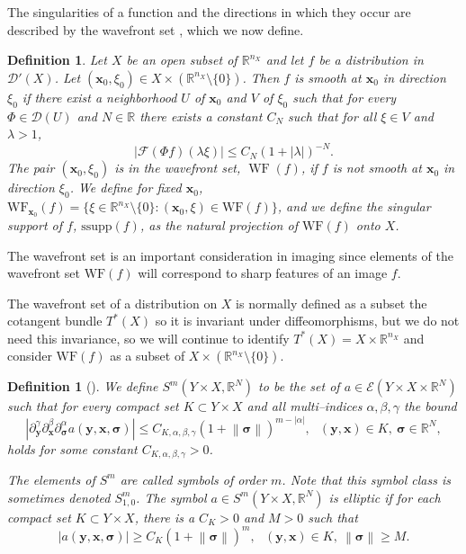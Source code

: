 \documentclass[11pt]{article}
\newcommand{\wf}{\operatorname{WF}}
\newcommand{\be}{\begin{equation}}
\newcommand{\ee}{\end{equation}}
\newcommand{\WF}{\mathrm{WF}}
\newcommand{\br}{\mathbb{R}}
\newcommand{\bt}{\beta}
\newcommand{\al}{\alpha}
\numberwithin{equation}{section}
\newcommand{\bel}[1]{\be\label{#1}}
\newcommand{\norm}[1]{\left\lVert#1\right\rVert}      %
\newcommand{\abs}[1]{\left|#1\right|}                 %
\newcommand{\vy}{\mathbf{y}}
\newcommand{\vx}{\mathbf{x}}
\newcommand{\Dc}{\mathcal{D}}
\newcommand{\Ec}{\mathcal{E}}
\newcommand{\Fc}{\mathcal{F}}
\newcommand{\vsig}{{\boldsymbol{\sigma}}}
\newcommand{\rr}{{{\mathbb R}}}
\newcommand{\rn}{{{\mathbb R}^n}}
\newtheorem{definition}[theorem]{Definition}
\theoremstyle{definition}
\begin{document}
\noindent The singularities of a function and the directions in which they occur
are described by the wavefront set \cite[Definition 8.1.2]{hor}, which we now define.
\begin{definition}
\label{WF} Let $X$ be an open subset of $\br^{n_X}$ and let $f$ be a distribution in $\mathcal{D}'(X)$.  Let $(\vx_0,\xi_0)\in X\times (\br^{n_X}\setminus\{0\})$.  Then $f$ is \emph{smooth at $\vx_0$ in direction $\xi_0$} if there exist a neighborhood $U$ of $\vx_0$ and $V$ of $\xi_0$ such that for every $\Phi\in \Dc(U)$ and $N\in\br$ there exists a constant $C_N$ such that for all $\xi\in V$ {and $\lambda >1$},
\be
\left|\Fc(\Phi f)(\lambda\xi)\right|\leq C_N(1+\abs{\lambda})^{-N}.
\ee
The pair $(\vx_0,\xi_0)$ is in the \emph{wavefront set,} $\wf(f)$, if
$f$ is not smooth at $\vx_0$ in direction $\xi_0$. We define for fixed $\vx_0$, $\WF_{\vx_0}(f) = \{\xi\in \br^{n_X}\setminus\{0\}: (\vx_0,\xi) \in \WF(f)\}$, and we define the singular support of $f$, $\text{ssupp}(f)$, as the natural projection of $\WF(f)$ onto $X$.
\end{definition}

The wavefront set is an important consideration in imaging since elements of the wavefront set $\WF(f)$ will correspond to sharp features of an image $f$.

The wavefront set of a distribution on $X$ is normally defined as a
subset the cotangent bundle $T^*(X)$ so it is invariant under
diffeomorphisms, but we do not need this invariance, so we will
continue to identify $T^*(X) = X \times \rr^{n_X}$ and consider $\WF(f)$ as
a subset of $X\times (\rr^{n_X}\setminus\{0\})$.


 \begin{definition}[{\cite[Definition 7.8.1]{hor}}] \label{ellip}We define
 $S^m(Y \times X, \br^N)$ to be the
set of $a\in \Ec(Y\times X\times \br^N)$ such that for every
compact set $K\subset Y\times X$ and all multi--indices $\al,
\bt, \gamma$ the bound
\[
\left|\partial^{\gamma}_{\vy}\partial^{\bt}_{\vx}\partial^{\al}_{\vsig}a(\vy,\vx,\vsig)\right|\leq
C_{K,\al,\bt,\gamma}(1+\norm{\vsig})^{m-|\al|},\ \ \ (\vy,\vx)\in K,\
\vsig\in\br^N,
\]
holds for some constant $C_{K,\al,\bt,\gamma}>0$. 

 The elements of $S^m$ are called \emph{symbols} of order $m$.  Note
that this symbol class is  sometimes denoted $S^m_{1,0}$.  The symbol
$a\in S^m(Y \times X,\rr^N)$ is \emph{elliptic} if for each compact set
$K\subset Y\times X$, there is a $C_K>0$ and $M>0$ such that
\bel{def:elliptic} \abs{a(\vy,\vx,\vsig)}\geq C_K(1+\norm{\vsig})^m,\
\ \ (\vy,\vx)\in K,\ \norm{\vsig}\geq M.
\ee 
\end{definition}
\end{document}
